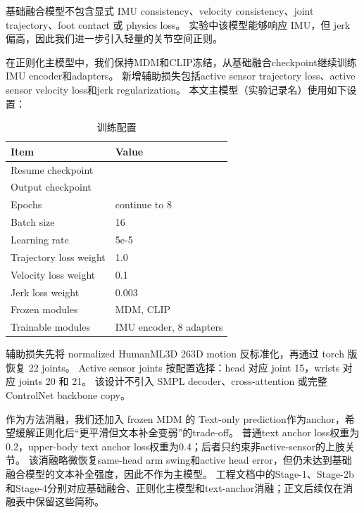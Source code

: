 基础融合模型不包含显式 IMU consistency、velocity consistency、joint trajectory、foot contact 或 physics loss。
实验中该模型能够响应 IMU，但 jerk 偏高，因此我们进一步引入轻量的关节空间正则。

在正则化主模型中，我们保持MDM和CLIP冻结，从基础融合checkpoint继续训练IMU encoder和adapters。
新增辅助损失包括active sensor trajectory loss、active sensor velocity loss和jerk regularization。
本文主模型（实验记录名\texttt{}）使用如下设置：

\begin{table}[t]
\centering
\caption{训练配置}
\label{tab:result-3}
\footnotesize
\setlength{\tabcolsep}{3pt}
\renewcommand{\arraystretch}{1.15}
\begin{tabularx}{\linewidth}{LL}
\toprule
Item & Value \\
\midrule
Resume checkpoint & \texttt{} \\
Output checkpoint & \texttt{} \\
Epochs & continue to 8 \\
Batch size & 16 \\
Learning rate & 5e-5 \\
Trajectory loss weight & 1.0 \\
Velocity loss weight & 0.1 \\
Jerk loss weight & 0.003 \\
Frozen modules & MDM, CLIP \\
Trainable modules & IMU encoder, 8 adapters \\
\bottomrule
\end{tabularx}
\end{table}


辅助损失先将 normalized HumanML3D 263D motion 反标准化，再通过 torch 版 \texttt{} 恢复 22 joints。
Active sensor joints 按配置选择：head 对应 joint 15，wrists 对应 joints 20 和 21。
该设计不引入 SMPL decoder、cross-attention 或完整 ControlNet backbone copy。

作为方法消融，我们还加入 frozen MDM 的 Text-only prediction作为anchor，希望缓解正则化后“更平滑但文本补全变弱”的trade-off。
普通text anchor loss权重为0.2，upper-body text anchor loss权重为0.4；后者只约束非active-sensor的上肢关节。
该消融略微恢复same-head arm swing和active head error，但仍未达到基础融合模型的文本补全强度，因此不作为主模型。
工程文档中的Stage-1、Stage-2b和Stage-4分别对应基础融合、正则化主模型和text-anchor消融；正文后续仅在消融表中保留这些简称。

